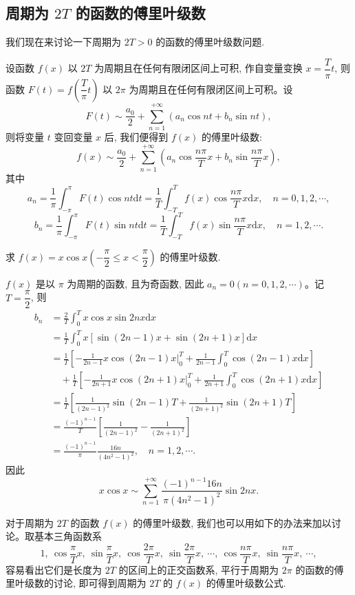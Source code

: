 \subsection{\texorpdfstring{周期为 $2T$ 的函数的傅里叶级数}{周期为 2T 的函数的傅里叶级数}}
\label{subsec:ma-12-1-4}

我们现在来讨论一下周期为 $2T>0$ 的函数的傅里叶级数问题.

设函数 $f(x)$ 以 $2T$ 为周期且在任何有限闭区间上可积, 作自变量变换 $x=\dfrac{T}{\pi}t$, 则函数 $F(t)=f\left(\dfrac{T}{\pi}t\right)$ 以 $2\pi$ 为周期且在任何有限闭区间上可积。设
\[
  F(t)\sim\frac{a_0}{2}+\sum_{n=1}^{+\infty}(a_n\cos nt+b_n\sin nt),
\]
则将变量 $t$ 变回变量 $x$ 后, 我们便得到 $f(x)$ 的傅里叶级数:
\[
  f(x)\sim\frac{a_0}{2}
  +\sum_{n=1}^{+\infty}\left(a_n\cos\frac{n\pi}{T}x+b_n\sin\frac{n\pi}{T}x\right),
\]
其中
\[
  a_n=\frac1\pi\int_{-\pi}^{\pi}F(t)\cos nt\mathrm dt
  =\frac1T\int_{-T}^{T}f(x)\cos\frac{n\pi}{T}x\mathrm dx,\quad n=0,1,2,\cdots,
\]
\[
  b_n=\frac1\pi\int_{-\pi}^{\pi}F(t)\sin nt\mathrm dt
  =\frac1T\int_{-T}^{T}f(x)\sin\frac{n\pi}{T}x\mathrm dx,\quad n=1,2,\cdots.
\]

\begin{example}\label{example:ma-12-1-5}
求 $f(x)=x\cos x\left(-\dfrac{\pi}{2}\leqslant x<\dfrac{\pi}{2}\right)$ 的傅里叶级数.
\end{example}


\begin{solve}
$f(x)$ 是以 $\pi$ 为周期的函数, 且为奇函数, 因此 $a_n=0(n=0,1,2,\cdots)$。记 $T=\dfrac{\pi}{2}$, 则
\[
\begin{aligned}
  b_n
  &=\frac2T\int_0^T x\cos x\sin 2nx\mathrm dx\\
  &=\frac1T\int_0^T x[\sin(2n-1)x+\sin(2n+1)x]\mathrm dx\\
  &=\frac1T\left[-\frac1{2n-1}x\cos(2n-1)x\bigg|_0^T
    +\frac1{2n-1}\int_0^T\cos(2n-1)x\mathrm dx\right]\\
  &\quad+\frac1T\left[-\frac1{2n+1}x\cos(2n+1)x\bigg|_0^T
    +\frac1{2n+1}\int_0^T\cos(2n+1)x\mathrm dx\right]\\
  &=\frac1T\left[\frac1{(2n-1)^2}\sin(2n-1)T
    +\frac1{(2n+1)^2}\sin(2n+1)T\right]\\
  &=\frac{(-1)^{n-1}}{T}\left[\frac1{(2n-1)^2}-\frac1{(2n+1)^2}\right]\\
  &=\frac{(-1)^{n-1}}{\pi}\frac{16n}{(4n^2-1)^2},\quad n=1,2,\cdots.
\end{aligned}
\]
因此
\[
  x\cos x\sim
  \sum_{n=1}^{+\infty}\frac{(-1)^{n-1}16n}{\pi(4n^2-1)^2}\sin 2nx.
\]

对于周期为 $2T$ 的函数 $f(x)$ 的傅里叶级数, 我们也可以用如下的办法来加以讨论。取基本三角函数系
\[
  1,\ \cos\frac{\pi}{T}x,\ \sin\frac{\pi}{T}x,\ \cos\frac{2\pi}{T}x,\ \sin\frac{2\pi}{T}x,\ \cdots,\ 
  \cos\frac{n\pi}{T}x,\ \sin\frac{n\pi}{T}x,\ \cdots,
\]
容易看出它们是长度为 $2T$ 的区间上的正交函数系, 平行于周期为 $2\pi$ 的函数的傅里叶级数的讨论, 即可得到周期为 $2T$ 的 $f(x)$ 的傅里叶级数公式.
\end{solve}


